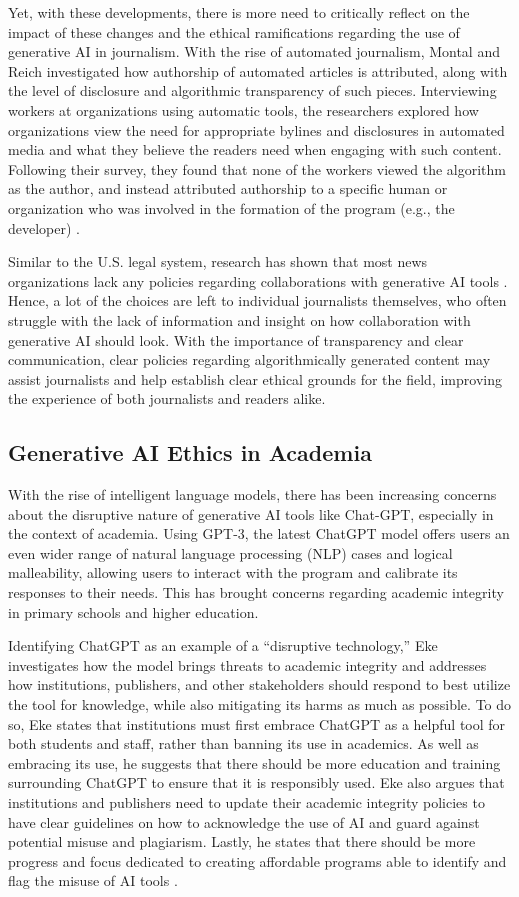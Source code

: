\documentclass[manuscript,screen]{acmart}
\begin{document}
Yet, with these developments, there is more need to critically reflect on the impact of these changes and the ethical ramifications regarding the use of generative AI in journalism. With the rise of automated journalism, Montal and Reich investigated how authorship of automated articles is attributed, along with the level of disclosure and algorithmic transparency of such pieces. Interviewing workers at organizations using automatic tools, the researchers explored how organizations view the need for appropriate bylines and disclosures in automated media and what they believe the readers need when engaging with such content. Following their survey, they found that none of the workers viewed the algorithm as the author, and instead attributed authorship to a specific human or organization who was involved in the formation of the program (e.g., the developer) \cite{PAPER:2}.

Similar to the U.S. legal system, research has shown that most news organizations lack any policies regarding collaborations with generative AI tools \cite{PAPER:2}. Hence, a lot of the choices are left to individual journalists themselves, who often struggle with the lack of information and insight on how collaboration with generative AI should look. With the importance of transparency and clear communication, clear policies regarding algorithmically generated content may assist journalists and help establish clear ethical grounds for the field, improving the experience of both journalists and readers alike. 

\subsection{Generative AI Ethics in Academia}
With the rise of intelligent language models, there has been increasing concerns about the disruptive nature of generative AI tools like Chat-GPT, especially in the context of academia. Using GPT-3, the latest ChatGPT model offers users an even wider range of natural language processing (NLP) cases and logical malleability, allowing users to interact with the program and calibrate its responses to their needs. This has brought concerns regarding academic integrity in primary schools and higher education. 

Identifying ChatGPT as an example of a “disruptive technology,” Eke investigates how the model brings threats to academic integrity and addresses how institutions, publishers, and other stakeholders should respond to best utilize the tool for knowledge, while also mitigating its harms as much as possible. To do so, Eke states that institutions must first embrace ChatGPT as a helpful tool for both students and staff, rather than banning its use in academics. As well as embracing its use, he suggests that there should be more education and training surrounding ChatGPT to ensure that it is responsibly used. Eke also argues that institutions and publishers need to update their academic integrity policies to have clear guidelines on how to acknowledge the use of AI and guard against potential misuse and plagiarism. Lastly, he states that there should be more progress and focus dedicated to creating affordable programs able to identify and flag the misuse of AI tools \cite{PAPER:9}.
\end{document}
